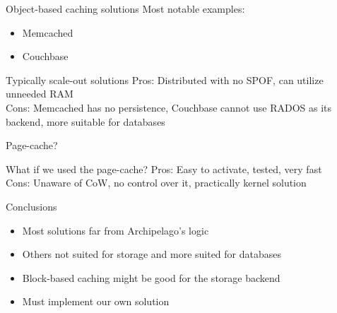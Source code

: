 \begin{frame}{Object-based caching solutions}
	Most notable examples:
	\begin{itemize}
		\item Memcached
		\item Couchbase
	\end{itemize}
	\dspc
	Typically scale-out solutions
	\dspc
	Pros: Distributed with no SPOF, can utilize unneeded RAM\\
	Cons: Memcached has no persistence, Couchbase cannot use RADOS as its 
	backend, more suitable for databases
\end{frame}

\begin{frame}{Page-cache?}

	What if we used the page-cache?
	\dspc
	\dspc
	\dspc
	Pros: Easy to activate, tested, very fast\\
	Cons: Unaware of CoW, no control over it, practically kernel solution\\

\end{frame}

\begin{frame}{Conclusions}

	\begin{itemize}
		\item Most solutions far from Archipelago's logic
		\item Others not suited for storage and more suited for 
			databases
		\item Block-based caching might be good for the storage backend
		\item Must implement our own solution
	\end{itemize}

	\note{\todo}
\end{frame}
	
